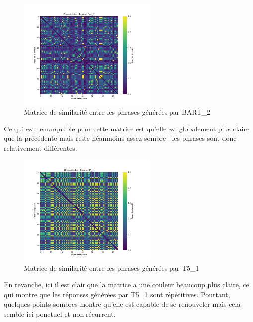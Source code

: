 \documentclass[conference]{IEEEtran}
\begin{document}
\vspace{5mm}

\begin{figure}[H]
\centering
\includegraphics[width=0.6\textwidth]{images/diversity_matrix_bart_2.png}
\caption{Matrice de similarité entre les phrases générées par BART\_2}
\end{figure}

\vspace{5mm}

Ce qui est remarquable pour cette matrice est qu'elle est globalement plus claire que la précédente mais reste néanmoins assez sombre : les phrases sont donc relativement différentes.

\vspace{5mm}

\begin{figure}[H]
\centering
\includegraphics[width=0.6\textwidth]{images/diversity_matrix_t5_1.png}
\caption{Matrice de similarité entre les phrases générées par T5\_1}
\end{figure}

\vspace{5mm}

En revanche, ici il est clair que la matrice a une couleur beaucoup plus claire, ce qui montre que les réponses générées par T5\_1 sont répétitives. Pourtant, quelques points sombres montre qu'elle est capable de se renouveler mais cela semble 
ici ponctuel et non récurrent.
\end{document}
